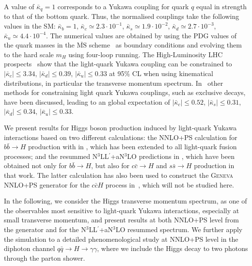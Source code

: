 \documentclass[11pt,a4paper]{article}
\begin{document}
A value of $ \bar\kappa_q = 1 $ corresponds to a Yukawa coupling for quark $ q $ equal in strength to that of the bottom quark. Thus, the normalised couplings take the following values in the SM:  
$ \bar \kappa_b = 1 $, $ \bar \kappa_c \simeq 2.3 \cdot 10^{-1} $, $ \bar \kappa_s \simeq 1.9 \cdot 10^{-2} $, $ \bar \kappa_d \simeq 2.7 \cdot 10^{-3} $, $ \bar \kappa_u \simeq 4.4 \cdot 10^{-4} $.
The numerical values are obtained by using the PDG values of the quark masses in the $\overline{\text{MS}}$ scheme~\cite{ParticleDataGroup:2024cfk} as boundary conditions and evolving them to the hard scale $m_H$ using four-loop running. The High-Luminosity LHC prospects~\cite{Cepeda:2019klc} show that the light-quark Yukawa coupling can be constrained to $|\bar \kappa_c|\leq 3.34$, $|\bar \kappa_d|\leq 0.39$, $|\bar \kappa_u|\leq 0.33$ at 95\% CL when using kinematical distributions, in particular the transverse momentum spectrum. In~ other methods for constraining light quark Yukawa couplings, such as exclusive decays, have been discussed, leading to an global expectation of $|\bar \kappa_c|\leq 0.52$, $|\bar \kappa_s|\leq 0.31$, $|\bar \kappa_d|\leq 0.34$, $|\bar \kappa_u|\leq 0.33$.

We present results for Higgs boson production induced by light-quark Yukawa interactions
based on two different calculations:
the NNLO+PS calculation for $b\bar b \to H$ production with \minnlo{} 
in , which has been extended to all light-quark fusion processes;
and the resummed 
N$^3$LL$^{\prime}$+aN$^3$LO predictions in ,
which have been obtained not only for $b\bar{b}\to H$, but also 
for $c\bar{c}\to H$ and $s\bar{s}\to H$ production in that work.
The latter calculation has also been used to construct the 
\textsc{Geneva} NNLO+PS generator for the $c\bar{c}H$ process in~, which will not be studied here.

In the following, we consider the Higgs transverse momentum spectrum, as one of the 
observables most sensitive to light-quark Yukawa interactions, especially at small 
transverse momentum, and present results at both NNLO+PS level from the 
\minnlo{} generator and for the N$^3$LL$^{\prime}$+aN$^3$LO resummed spectrum.
We further apply the \minnlo{}  simulation to a detailed phenomenological study at 
NNLO+PS level in the diphoton channel $q\bar q\rightarrow H\rightarrow \gamma\gamma$, where we include the Higgs decay to two photons through
the  parton shower.
\end{document}
